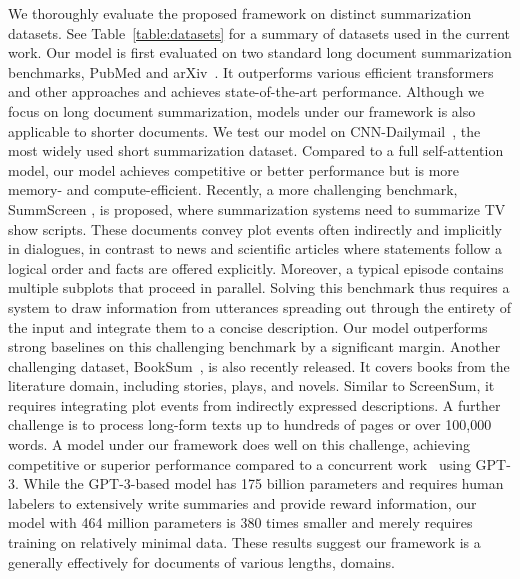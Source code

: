 \documentclass{article} \usepackage{iclr2022_conference,times}
\begin{document}
We thoroughly evaluate the proposed framework on distinct summarization datasets. See Table~\ref{table:datasets} for a summary of datasets used in the current work. Our model is first evaluated on two standard long document summarization benchmarks, PubMed and arXiv~\citep{cohan-etal-2018-discourse}. It outperforms various efficient transformers and other approaches and achieves state-of-the-art performance. Although we focus on long document summarization, models under our framework is also applicable to shorter documents. We test our model on CNN-Dailymail~\citep{see-etal-2017-get}, the most widely used short summarization dataset. Compared to a full self-attention model, our model achieves competitive or better performance but is more memory- and compute-efficient. Recently, a more challenging benchmark, SummScreen \citep{chen2021summscreen}, is proposed, where summarization systems need to summarize TV show scripts. These documents convey plot events often indirectly and implicitly in dialogues, in contrast to news and scientific articles where statements follow a logical order and facts are offered explicitly. Moreover, a typical episode contains multiple subplots that proceed in parallel. Solving this benchmark thus requires a system to draw information from utterances spreading out through the entirety of the input and integrate them to a concise description. Our model outperforms strong baselines on this challenging benchmark by a significant margin. Another challenging dataset, BookSum~\citep{kryscinski2021booksum}, is also recently released. It covers books from the literature domain, including stories, plays, and novels. Similar to ScreenSum, it requires integrating plot events from indirectly expressed descriptions. A further challenge is to process long-form texts up to hundreds of pages or over 100,000 words. A model under our framework does well on this challenge, achieving competitive or superior performance compared to a concurrent work~\citep{wu2021recursively} using GPT-3. While the GPT-3-based model has 175 billion parameters and requires human labelers to extensively write summaries and provide reward information, our model with 464 million parameters is 380 times smaller and merely requires training on relatively minimal data. These results suggest our framework is a generally effectively for documents of various lengths, domains. 
\end{document}
